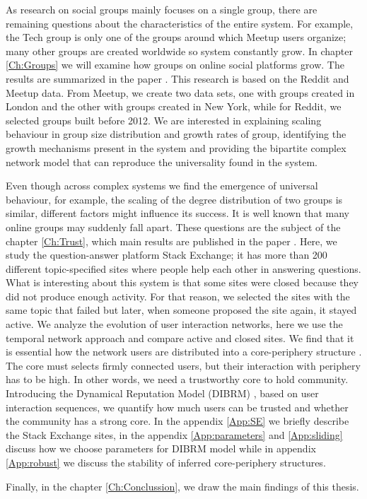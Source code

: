 As research on social groups mainly focuses on a single group, there are remaining questions about the characteristics of the entire system. 
For example, the Tech group is only one of the groups around which Meetup users organize; many other groups are created worldwide so system constantly grow. 
In chapter \ref{Ch:Groups} we will examine how groups on online social platforms grow. The results are summarized in the paper  \cite{vranic2022universal}. This research is based on the Reddit and Meetup data. From Meetup, we create two data sets, one with groups created in London and the other with groups created in New York, while for Reddit, we selected groups built before 2012. We are interested in explaining scaling behaviour in group size distribution and growth rates of group, identifying the growth mechanisms present in the system and providing the bipartite complex network model that can reproduce the universality found in the system.

Even though across complex systems we find the emergence of universal behaviour, for example, the scaling of the degree distribution of two groups is similar, different factors might influence its success. It is well known that many online groups may suddenly fall apart. These questions are the subject of the chapter \ref{Ch:Trust}, which main results are published in the paper \cite{vranic2022sustainability}. Here, we study the question-answer platform Stack Exchange; it has more than 200 different topic-specified sites where people help each other in answering questions. What is interesting about this system is that some sites were closed because they did not produce enough activity. For that reason, we selected the sites with the same topic that failed but later, when someone proposed the site again, it stayed active. We analyze the evolution of user interaction networks, here we use the temporal network approach and compare active and closed sites. We find that it is essential how the network users are distributed into a core-periphery structure \cite{gallagher2020clarified}. The core must selects firmly connected users, but their interaction with periphery has to be high. In other words, we need a trustworthy core to hold community. Introducing the Dynamical Reputation Model (DIBRM) \cite{melnikov2018toward}, based on user interaction sequences, we quantify how much users can be trusted and whether the community has a strong core. In the appendix \ref{App:SE} we briefly describe the Stack Exchange sites, in the appendix \ref{App:parameters} and \ref{App:sliding} discuss how we choose parameters  for DIBRM model while in appendix \ref{App:robust} we discuss the stability of inferred core-periphery structures. 

Finally, in the chapter \ref{Ch:Conclussion}, we draw the main findings of this thesis. 










